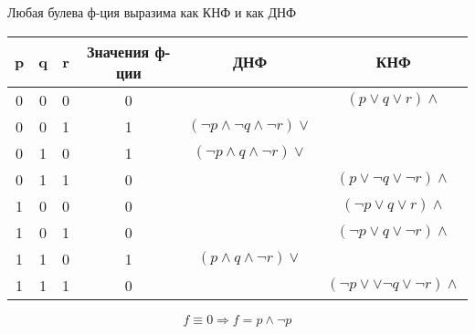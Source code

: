 \begin{theorem}
Любая булева ф-ция выразима как КНФ и как ДНФ
\end{theorem}
\begin{center}
    \begin{tabular}{ |c|c|c|c|c|c| } 
 \hline
 p & q & r & Значения ф-ции & ДНФ & КНФ \\
 \hline
 0 & 0 & 0 & 0 & & $(p \lor q \lor r) \land$ \\
 \hline
 0 & 0 & 1 & 1 & $(\neg p \land \neg q \land \neg r) \lor$ & \\
 \hline
 0 & 1 & 0 & 1 & $(\neg p \land q \land \neg r) \lor$ &\\
 \hline
 0 & 1 & 1 & 0 & & $(p \lor \neg q \lor \neg r) \land$\\
 \hline
 1 & 0 & 0 & 0 & & $(\neg p \lor q \lor r) \land$\\
 \hline
 1 & 0 & 1 & 0 & & $(\neg p \lor q \lor \neg r) \land$\\
 \hline
 1 & 1 & 0 & 1 & $(p \land q \land \neg r) \lor$ &\\
 \hline
 1 & 1 & 1 & 0 & & $(\neg p \lor \lor \neg q \lor \neg r) \land$\\
 \hline
\end{tabular}
\end{center}
\begin{example}
\[
f \equiv 0 \Rightarrow f = p \land \neg p
\] 
\end{example}

